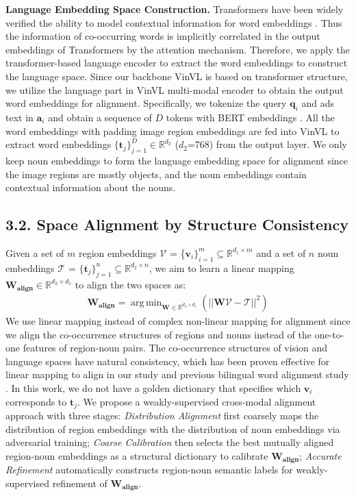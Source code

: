 \documentclass[letterpaper]{article} \usepackage{aaai24}  \usepackage{times}  \usepackage{helvet}  \usepackage{courier}  \usepackage[hyphens]{url}  \usepackage{graphicx} \urlstyle{rm} \def\UrlFont{\rm}  \usepackage{natbib}  \usepackage{caption} \frenchspacing  \setlength{\pdfpagewidth}{8.5in}  \setlength{\pdfpageheight}{11in}
\DeclareMathOperator*{\argmin}{arg\,min}
\begin{document}
\noindent\textbf{Language Embedding Space Construction.} 
Transformers have been widely verified the ability to model contextual information for word embeddings \cite{devlin2019bert, floridi2020gpt}. Thus the information of co-occurring words is implicitly correlated in the output embeddings of Transformers by the attention mechanism. Therefore, we apply the transformer-based language encoder to extract the word embeddings to construct the language space. Since our backbone VinVL is based on transformer structure,  we utilize the language part in VinVL multi-modal encoder to obtain the output word embeddings for alignment. Specifically, we tokenize the query $\boldsymbol{q}_i$ and ads text in $\boldsymbol{a}_i$  and obtain a sequence of $D$ tokens with BERT embeddings \cite{devlin2019bert}. 
All the word embeddings with padding image region embeddings are fed into VinVL to extract word embeddings $\{\boldsymbol{t}_j\}_{j=1}^D \in{\mathbb{R}^{d_2}}$ ($d_2$=768) from the output layer. We only keep noun embeddings to form the language embedding space for alignment since the image regions are mostly objects, and the noun embeddings contain contextual information about the nouns. 

\subsection{3.2. Space Alignment by Structure Consistency}
\label{ssec:space alignment}
Given a set of $m$ region embeddings $\mathcal{V}$ = \{$\boldsymbol{v}_i\}_{i=1}^m\subseteq{\mathbb{R}^{d_1\times{m}}}$  and a set of $n$ noun embeddings $\mathcal{T}$ = $\{\boldsymbol{t}_j\}_{j=1}^n\subseteq{\mathbb{R}^{d_2\times{n}}}$, we aim to learn a linear mapping $\boldsymbol{W_{{align}}}\in{\mathbb{R}^{d_2\times{d_1}}}$ to align the two spaces as: 
\begin{equation}
\begin{aligned}
\boldsymbol{W_{align}} = \argmin_{\boldsymbol{W}\in{\mathbb{R}^{d_2\times{d_1}}}}(||\boldsymbol{W}\mathcal{V} - \mathcal{T}||^2)
\end{aligned}
\label{f:Walign}
\end{equation}
We use linear mapping instead of complex non-linear mapping for alignment since we align the co-occurrence structures of regions and nouns instead of the one-to-one features of region-noun pairs. The co-occurrence structures of vision and language spaces have natural consistency, which has been proven effective for linear mapping to align in our study and previous bilingual word alignment study \cite{lample2018word}.  In this work, we do not have a golden dictionary that specifies which $\boldsymbol{v}_i$ corresponds to $\boldsymbol{t}_j$. 
We propose a weakly-supervised cross-modal alignment approach with three stages: \textit{Distribution Alignment} first coarsely maps the distribution of region embeddings with the distribution of noun embeddings via adversarial training; \textit{Coarse Calibration} then selects the best mutually aligned region-noun embeddings as a structural dictionary to calibrate $\boldsymbol{W_{{align}}}$;  \textit{Accurate Refinement} automatically constructs region-noun semantic labels for weakly-supervised refinement of $\boldsymbol{W_{{align}}}$.
\end{document}
